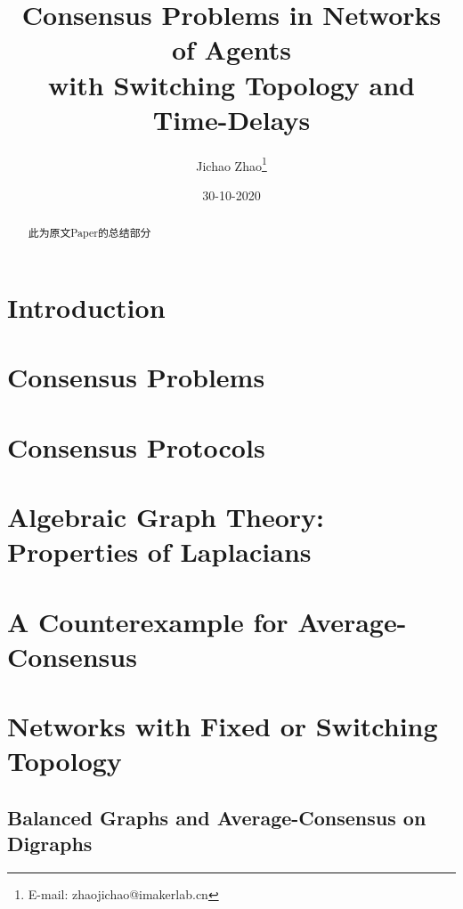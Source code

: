 \documentclass{article}
\title{Consensus Problems in Networks of Agents\\ with Switching Topology and Time-Delays}
\author{ Jichao Zhao\thanks{E-mail: zhaojichao@imakerlab.cn}}
\date{30-10-2020}
\begin{document}
\maketitle

\begin{abstract}
    此为原文Paper的总结部分
\end{abstract}


\clearpage
\tableofcontents

\clearpage
\section{Introduction}

\section{Consensus Problems}

\section{Consensus Protocols}

\section{Algebraic Graph Theory: Properties of Laplacians}

\section{A Counterexample for Average-Consensus}

\section{Networks with Fixed or Switching Topology}

\subsection{Balanced Graphs and Average-Consensus on Digraphs}
\end{document}
